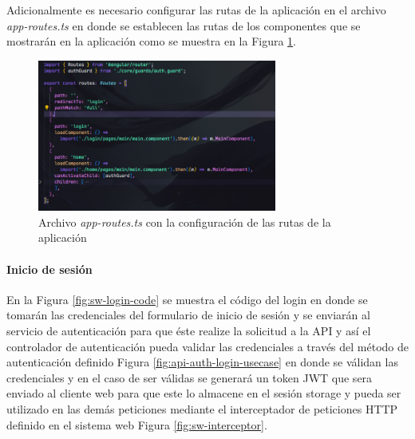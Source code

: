 Adicionalmente es necesario configurar las rutas de la aplicación en el archivo \textit{app-routes.ts} en donde se establecen las rutas de los componentes que se mostrarán en la aplicación como se muestra en la Figura \ref{fig:app-routing}.

\begin{figure}[H]
    \centering
    \includegraphics[width=0.7\textwidth]{resources/images/app-routes}
    \caption{Archivo \textit{app-routes.ts} con la configuración de las rutas de la aplicación}
    \label{fig:app-routing}
\end{figure}

\paragraph{Inicio de sesión}

En la Figura \ref{fig:sw-login-code} se muestra el código del login en donde se tomarán las credenciales del formulario de inicio de sesión y se enviarán al servicio de autenticación para que éste realize la solicitud a la API y así el controlador de autenticación pueda validar las credenciales a través del método de autenticación definido Figura \ref{fig:api-auth-login-usecase} en donde se válidan las credenciales y en el caso de ser válidas se generará un token JWT que sera enviado al cliente web para que este lo almacene en el sesión storage y pueda ser utilizado en las demás peticiones mediante el interceptador de peticiones HTTP definido en el sistema web Figura \ref{fig:sw-interceptor}.

